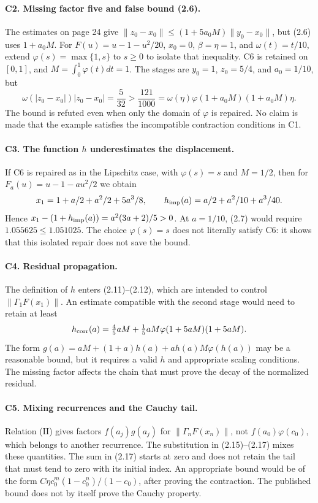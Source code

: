 \documentclass[11pt,a4paper]{article}
\numberwithin{equation}{section}
\numberwithin{table}{section}
\theoremstyle{plain}
\theoremstyle{definition}\newtheorem{definition}[theorem]{Definition}
\theoremstyle{remark}\newtheorem{remark}[theorem]{Remark}
\begin{document}
\paragraph{C2. Missing factor five and false bound (2.6).}
The estimates on page 24 give
$\|z_0-x_0\|\leq(1+5a_0M)\|y_0-x_0\|$, but (2.6) uses $1+a_0M$.
For $F(u)=u-1-u^2/20$, $x_0=0$, $\beta=\eta=1$, and
$\omega(t)=t/10$, extend $\varphi(s)=\max\{1,s\}$ to $s\geq0$
to isolate that inequality. C6 is retained on $[0,1]$, and
$M=\int_0^1\varphi(t)dt=1$.
The stages are $y_0=1$, $z_0=5/4$, and $a_0=1/10$, but
\[
 \omega(|z_0-x_0|)|z_0-x_0|=\frac5{32}>
 \frac{121}{1000}=\omega(\eta)\varphi(1+a_0M)(1+a_0M)\eta.
\]
The bound is refuted even when only the domain of $\varphi$ is
repaired. No claim is made that the example satisfies the incompatible
contraction conditions in C1.

\paragraph{C3. The function $h$ underestimates the displacement.}
If C6 is repaired as in the Lipschitz case, with $\varphi(s)=s$ and
$M=1/2$, then for $F_a(u)=u-1-au^2/2$ we obtain
\[
 x_1=1+a/2+a^2/2+5a^3/8,\qquad
 h_{\rm imp}(a)=a/2+a^2/10+a^3/40.
\]
Hence $x_1-(1+h_{\rm imp}(a))=a^2(3a+2)/5>0$. At $a=1/10$,
(2.7) would require $1.055625\leq1.051025$.
The choice $\varphi(s)=s$ does not literally satisfy C6: it shows
that this isolated repair does not save the bound.

\paragraph{C4. Residual propagation.}
The definition of $h$ enters (2.11)--(2.12), which are intended to
control $\|\Gamma_1F(x_1)\|$. An estimate compatible with the second
stage would need to retain at least
\[
 h_{\rm corr}(a)=\tfrac45aM+\tfrac15aM\varphi(1+5aM)(1+5aM).
\]
The form $g(a)=aM+(1+a)h(a)+ah(a)M\varphi(h(a))$ may be a reasonable
bound, but it requires a valid $h$ and appropriate scaling conditions.
The missing factor affects the chain that must prove the decay of
the normalized residual.

\paragraph{C5. Mixing recurrences and the Cauchy tail.}
Relation (II) gives factors $f(a_j)g(a_j)$ for $\|\Gamma_nF(x_n)\|$,
not $f(a_0)\varphi(c_0)$, which belongs to another recurrence.
The substitution in (2.15)--(2.17) mixes these quantities.
The sum in (2.17) starts at zero and does not retain the tail that
must tend to zero with its initial index. An appropriate bound would
be of the form $C\eta c_0^m(1-c_0^n)/(1-c_0)$, after proving the
contraction. The published bound does not by itself prove the
Cauchy property.
\end{document}
